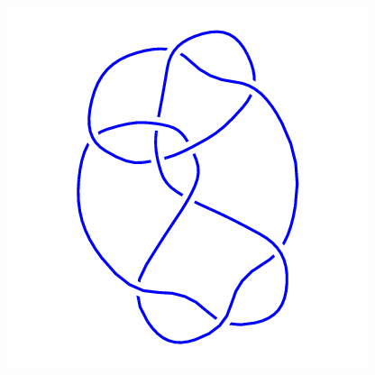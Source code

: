 \begin{figure}[H]
\begin{minipage}[b]{.18\linewidth}
    \end{minipage}
    \begin{minipage}[b]{.18\linewidth}
        \centering
        \includegraphics[width=\linewidth]{../data/10_86.png}
    \end{minipage}
\end{figure}
